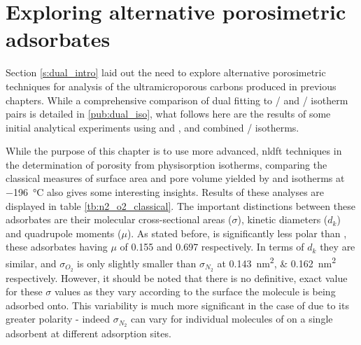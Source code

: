\section[Exploring alternative porosimetric adsorbates]{Exploring alternative porosimetric \glspl{adsorbate}}
\label{s:dual_initial}
Section \ref{s:dual_intro} laid out the need to explore alternative porosimetric techniques for analysis of the ultramicroporous carbons produced in previous chapters. While a comprehensive comparison of dual fitting to / and / isotherm pairs is detailed in \ref{pub:dual_iso}, what follows here are the results of some initial analytical experiments using  and , and combined / isotherms.

While the purpose of this chapter is to use more advanced, \acrshort{nldft} techniques in the determination of porosity from \gls{physisorption} isotherms, comparing the classical measures of surface area and pore volume yielded by  and  isotherms at \qty{-196}{\degreeCelsius} also gives some interesting insights. Results of these analyses are displayed in table \ref{tb:n2_o2_classical}. The important distinctions between these \glspl{adsorbate} are their molecular cross-sectional areas ($\sigma$), kinetic diameters ($d_k$) and quadrupole moments ($\mu$). As stated before,  is significantly less polar than , these \glspl{adsorbate} having $\mu$ of 0.155 and 0.697 respectively.\citep{Lide2007Handbook, Poling2001Properties, Graham1998Measurement} In terms of $d_k$ they are similar, and $\sigma_{O_2}$ is only slightly smaller than $\sigma_{N_2}$ at \qtylist[list-units=single]{0.143; 0.162}{\nm\squared}  respectively. However, it should be noted that there is no definitive, exact value for these $\sigma$ values as they vary according to the surface the molecule is being adsorbed onto.\citep{kodera1959molecular, kodera1960molecular, livingston1949cross} This variability is much more significant in the case of  due to its greater polarity - indeed $\sigma_{N_2}$ can vary for individual molecules of  on a single \gls{adsorbent} at different \gls{adsorption} sites.\citep{Jagiello2020Exploiting}

